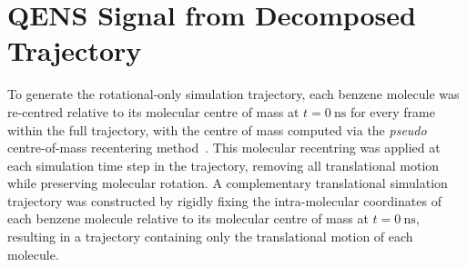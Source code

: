 \documentclass[reprint,
               superscriptaddress,
               nobibnotes,
               amsmath,
               amssymb,
               aps,
               hidelinks, 
               pre]{revtex4-2}
\begin{document}
\section{QENS Signal from Decomposed Trajectory}
\label{sec:decomp}

To generate the rotational-only simulation trajectory, each benzene molecule was re-centred relative to its molecular centre of mass at $t = \qty{0}{\nano\second}$ for every frame within the full trajectory, with the centre of mass computed via the \emph{pseudo} centre-of-mass recentering method~\cite{Richardson2025}. 
This molecular recentring was applied at each simulation time step in the trajectory, removing all translational motion while preserving molecular rotation.
A complementary translational simulation trajectory was constructed by rigidly fixing the intra-molecular coordinates of each benzene molecule relative to its molecular centre of mass at $t = \qty{0}{\nano\second}$, resulting in a trajectory containing only the translational motion of each molecule.
\end{document}
